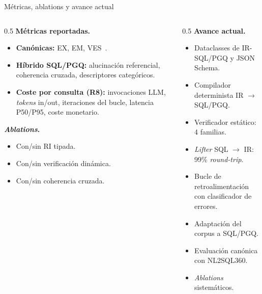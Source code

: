 \documentclass[aspectratio=169]{beamer}
\begin{document}
\begin{frame}{Métricas, ablations y avance actual}
\begin{columns}[T]
\begin{column}{0.5\textwidth}
\textbf{Métricas reportadas.}
\begin{itemize}\footnotesize
    \item \textbf{Canónicas:} EX, EM, VES~\parencite{SuperSQL2024}.
    \item \textbf{Híbrido SQL/PGQ:} alucinación referencial, coherencia cruzada, descriptores categóricos.
    \item \textbf{Coste por consulta (R8):} invocaciones LLM, \emph{tokens} in/out, iteraciones del bucle, latencia P50/P95, coste monetario.
\end{itemize}

\textbf{\emph{Ablations}.}
\begin{itemize}\footnotesize
    \item Con/sin RI tipada.
    \item Con/sin verificación dinámica.
    \item Con/sin coherencia cruzada.
\end{itemize}
\end{column}
\begin{column}{0.5\textwidth}
\textbf{Avance actual.}
\begin{itemize}\footnotesize
    \item[\textcolor{tkGreen}{\textbf{\checkmark}}] Dataclasses de IR-SQL/PGQ y JSON Schema.
    \item[\textcolor{tkGreen}{\textbf{\checkmark}}] Compilador determinista IR $\to$ SQL/PGQ.
    \item[\textcolor{tkGreen}{\textbf{\checkmark}}] Verificador estático: 4 familias.
    \item[\textcolor{tkGreen}{\textbf{\checkmark}}] \emph{Lifter} SQL $\to$ IR: 99\% \emph{round-trip}.
    \item[\textcolor{tkOrange}{\textbf{$\rightarrow$}}] Bucle de retroalimentación con clasificador de errores.
    \item[\textcolor{tkRed}{$\square$}] Adaptación del corpus a SQL/PGQ.
    \item[\textcolor{tkRed}{$\square$}] Evaluación canónica con NL2SQL360.
    \item[\textcolor{tkRed}{$\square$}] \emph{Ablations} sistemáticos.
\end{itemize}
\end{column}
\end{columns}
\end{frame}
\end{document}
